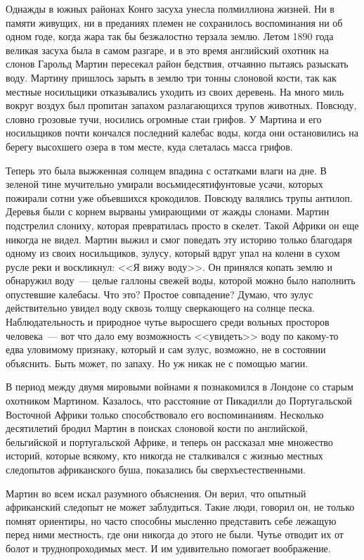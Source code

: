 \documentclass[12pt,a4paper,twoside,openany,svgnames]{memoir}
\begin{document}
Однажды в южных районах Конго засуха унесла полмиллиона жизней. Ни в памяти живущих, ни в преданиях племен не сохранилось воспоминания ни об одном годе, когда жара так бы безжалостно терзала землю. Летом 1890 года великая засуха была в самом разгаре, и в это время английский охотник на слонов Гарольд Мартин пересекал район бедствия, отчаянно пытаясь разыскать воду. Мартину пришлось зарыть в землю три тонны слоновой кости, так как местные носильщики отказывались уходить из своих деревень. На много миль вокруг воздух был пропитан запахом разлагающихся трупов животных. Повсюду, словно грозовые тучи, носились огромные стаи грифов. У Мартина и его носильщиков почти кончался последний калебас воды, когда они остановились на берегу высохшего озера в том месте, куда слеталась масса грифов.

Теперь это была выжженная солнцем впадина с остатками влаги на дне. В зеленой тине мучительно умирали восьмидесятифунтовые усачи, которых пожирали сотни уже объевшихся крокодилов. Повсюду валялись трупы антилоп. Деревья были с корнем вырваны умирающими от жажды слонами. Мартин подстрелил слониху, которая превратилась просто в скелет. Такой Африки он еще никогда не видел. Мартин выжил и смог поведать эту историю только благодаря одному из своих носильщиков, зулусу, который вдруг упал на колени в сухом русле реки и воскликнул: <<Я вижу воду>>. Он принялся копать землю и обнаружил воду~--- целые галлоны свежей воды, которой можно было наполнить опустевшие калебасы. Что это? Простое совпадение? Думаю, что зулус действительно увидел воду сквозь толщу сверкающего на солнце песка. Наблюдательность и природное чутье выросшего среди вольных просторов человека~--- вот что дало ему возможность <<увидеть>> воду по какому-то едва уловимому признаку, который и сам зулус, возможно, не в состоянии объяснить. Быть может, по запаху. Но уж никак не с помощью магии.

В период между двумя мировыми войнами я познакомился в Лондоне со старым охотником Мартином. Казалось, что расстояние от Пикадилли до Португальской Восточной Африки только способствовало его воспоминаниям. Несколько десятилетий бродил Мартин в поисках слоновой кости по английской, бельгийской и португальской Африке, и теперь он рассказал мне множество историй, которые всякому, кто никогда не сталкивался с жизнью местных следопытов африканского буша, показались бы сверхъестественными.

Мартин во всем искал разумного объяснения. Он верил, что опытный африканский следопыт не может заблудиться. Такие люди, говорил он, не только помнят ориентиры, но часто способны мысленно представить себе лежащую перед ними местность, где они никогда до этого не были. Чутье отводит их от болот и труднопроходимых мест. И им удивительно помогает воображение.
\end{document}
